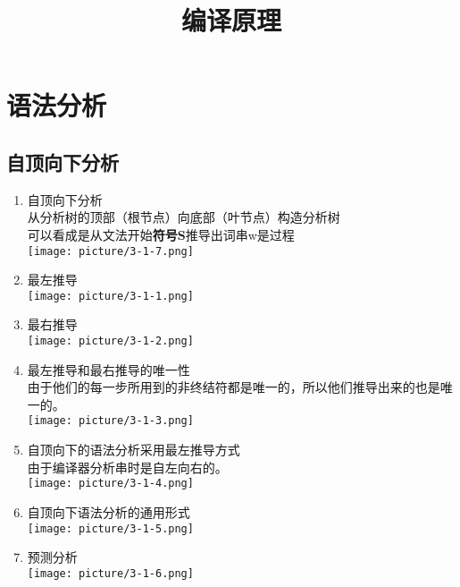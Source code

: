 \documentclass[UTF8]{article}
\title{\textbf{编译原理}}
\begin{document}
	\maketitle
	\section{语法分析}
		\subsection{自顶向下分析}
		\begin{enumerate}
			\item 自顶向下分析\\
			从分析树的顶部（根节点）向底部（叶节点）构造分析树\\
			可以看成是从文法开始\textbf{符号S}推导出词串w是过程	\\
			\texttt{[image: picture/3-1-7.png]}
			
			
			\item 最左推导\\
			\texttt{[image: picture/3-1-1.png]}
			
			\item 最右推导\\
			\texttt{[image: picture/3-1-2.png]}
		
			\item 最左推导和最右推导的唯一性\\
			由于他们的每一步所用到的非终结符都是唯一的，所以他们推导出来的也是唯一的。\\
			\texttt{[image: picture/3-1-3.png]}
			
			\item 自顶向下的语法分析采用最左推导方式\\
			由于编译器分析串时是自左向右的。\\
			\texttt{[image: picture/3-1-4.png]}
			
			\item 自顶向下语法分析的通用形式\\
			\texttt{[image: picture/3-1-5.png]}
			
			\item 预测分析\\
			\texttt{[image: picture/3-1-6.png]}
		\end{enumerate}
		
		
\end{document}
